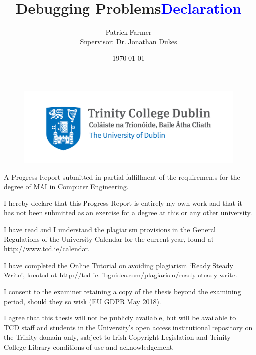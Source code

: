 \documentclass[12pt]{extarticle}
\begin{document}
\doublespacing

\title{\textbf{Debugging Problems}}
\author{Patrick Farmer\\ Supervisor: Dr. Jonathan Dukes}
\date{\today}
\maketitle

\begin{figure}[h!]
\centering
\includegraphics[width=\linewidth]{Images/Trinity_Main_Logo.jpg}
\label{fig:logo}
\end{figure}

\begin{center}
\large A Progress Report submitted in partial fulfillment of the requirements for the degree of MAI in Computer Engineering.
\end{center}

\newpage
\title {\Huge \textbf{\textcolor{blue}{Declaration}}}

\vspace{0.5cm}
\small I hereby declare that this Progress Report is entirely my own work and that it has not been submitted as an exercise for a degree at this or any other university.

\vspace{0.5cm}
\small I have read and I understand the plagiarism provisions in the General Regulations of the University Calendar for the current year, found at http://www.tcd.ie/calendar.
\vspace{0.5cm}

\small I have completed the Online Tutorial on avoiding plagiarism `Ready Steady Write', located at http://tcd-ie.libguides.com/plagiarism/ready-steady-write.
\vspace{0.5cm}

\small I consent to the examiner retaining a copy of the thesis beyond the examining period, should they so wish (EU GDPR May 2018).
\vspace{0.5cm}

\small I agree that this thesis will not be publicly available, but will be available to TCD staff and students in the University’s open access institutional repository on the Trinity domain only, subject to Irish Copyright Legislation and Trinity College Library conditions of use and acknowledgement.
\vspace{2cm}
\end{document}
